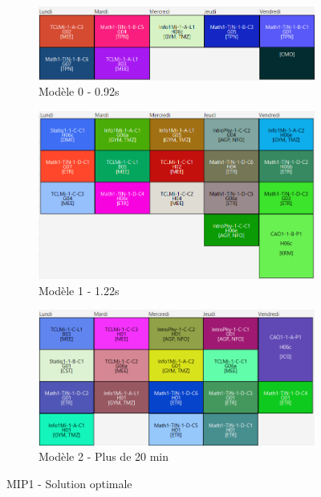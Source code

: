 \begin{figure}[H]
    \begin{subfigure}{0.3\linewidth}
        \centering
        \includegraphics[width=\linewidth]{./assets/figures/perfMIP1const0_0.92.png}
        \caption{Modèle 0 - 0.92s}
    \end{subfigure}
    \hfill
    \begin{subfigure}{0.3\linewidth}
        \centering
        \includegraphics[width=\linewidth]{./assets/figures/perfMIP1const1_1.22.png}
        \caption{Modèle 1 - 1.22s}
    \end{subfigure}
    \hfill
    \begin{subfigure}{0.3\linewidth}
        \centering
        \includegraphics[width=\linewidth]{./assets/figures/perfMIP1const2_20min.png}
        \caption{Modèle 2 - Plus de 20 min}
    \end{subfigure}
    \caption{MIP1 - Solution optimale}
\end{figure}

